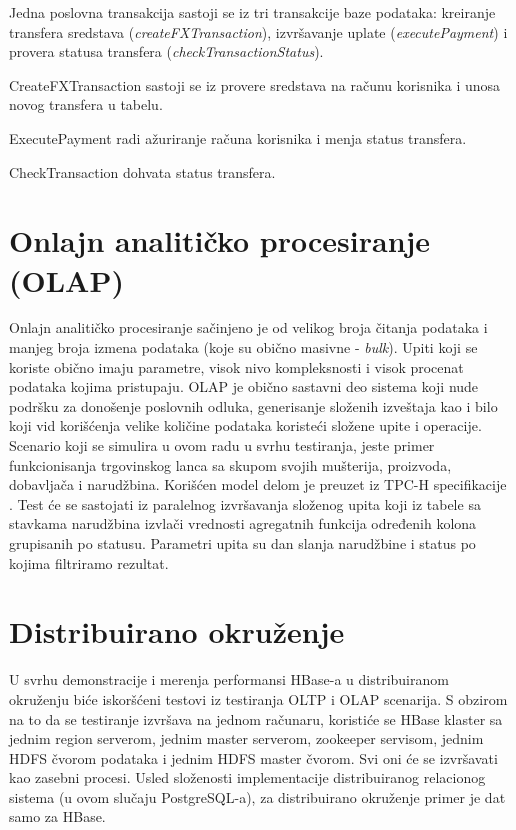 \documentclass[12pt,oneside]{memoir}
\begin{document}
Jedna poslovna transakcija sastoji se iz tri transakcije baze podataka: kreiranje transfera sredstava (\textit{createFXTransaction}), izvršavanje uplate (\textit{executePayment}) i provera statusa transfera (\textit{checkTransactionStatus}).

CreateFXTransaction sastoji se iz provere sredstava na računu korisnika i unosa novog transfera u tabelu.

ExecutePayment radi ažuriranje računa korisnika i menja status transfera.

CheckTransaction dohvata status transfera.

\section{Onlajn analitičko procesiranje (OLAP)}

Onlajn analitičko procesiranje sačinjeno je od velikog broja čitanja podataka i manjeg broja izmena podataka (koje su obično masivne - \textit{bulk}). Upiti koji se koriste obično imaju parametre, visok nivo kompleksnosti i visok procenat podataka kojima pristupaju. OLAP je obično sastavni deo sistema koji nude podršku za donošenje poslovnih odluka, generisanje složenih izveštaja kao i bilo koji vid korišćenja velike količine podataka koristeći složene upite i operacije. Scenario koji se simulira u ovom radu u svrhu testiranja, jeste primer funkcionisanja trgovinskog lanca sa skupom svojih mušterija, proizvoda, dobavljača i narudžbina. Korišćen model delom je preuzet iz TPC-H specifikacije \cite{tpch}. Test će se sastojati iz paralelnog izvršavanja složenog upita koji iz tabele sa stavkama narudžbina izvlači vrednosti agregatnih funkcija određenih kolona grupisanih po statusu. Parametri upita su dan slanja narudžbine i status po kojima filtriramo rezultat.


\section{Distribuirano okruženje}

U svrhu demonstracije i merenja performansi HBase-a u distribuiranom okruženju biće iskoršćeni testovi iz testiranja OLTP i OLAP  scenarija. S obzirom na to da se testiranje izvršava na jednom računaru, koristiće se HBase klaster sa jednim region serverom, jednim master serverom, zookeeper servisom,  jednim HDFS čvorom podataka i jednim HDFS master čvorom. Svi oni će se izvršavati kao zasebni procesi. Usled složenosti implementacije distribuiranog relacionog sistema (u ovom slučaju PostgreSQL-a), za distribuirano okruženje primer je dat samo za HBase.
\end{document}
